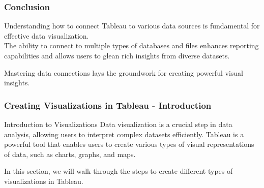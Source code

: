 \documentclass[aspectratio=169]{beamer}
\begin{document}
\begin{frame}[fragile]
    \frametitle{Conclusion}
    Understanding how to connect Tableau to various data sources is fundamental for effective data visualization.\\
    The ability to connect to multiple types of databases and files enhances reporting capabilities and allows users to glean rich insights from diverse datasets.
    
    Mastering data connections lays the groundwork for creating powerful visual insights.
\end{frame}

\begin{frame}[fragile]
    \frametitle{Creating Visualizations in Tableau - Introduction}
    \begin{block}{Introduction to Visualizations}
        Data visualization is a crucial step in data analysis, allowing users to interpret complex datasets efficiently. Tableau is a powerful tool that enables users to create various types of visual representations of data, such as charts, graphs, and maps.
    \end{block}
    In this section, we will walk through the steps to create different types of visualizations in Tableau.
\end{frame}
\end{document}

